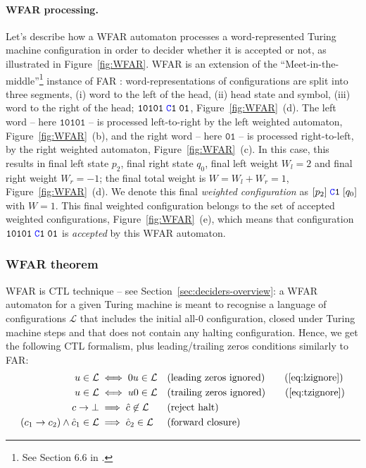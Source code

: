 \paragraph{WFAR processing.} Let's describe how a WFAR automaton processes a word-represented Turing machine configuration in order to decider whether it is accepted or not, as illustrated in Figure~\ref{fig:WFAR}. WFAR is an extension of the ``Meet-in-the-middle''\footnote{See Section 6.6 in \cite{bbchallengePart1}.} instance of FAR \cite{bbchallengePart1}: word-representations of configurations are split into three segments, (i) word to the left of the head, (ii) head state and symbol, (iii) word to the right of the head; \eg $\texttt{10101}\; \texttt{\stateC}\sone\; \texttt{01}$, Figure~\ref{fig:WFAR}~(d). The left word -- here $\texttt{10101}$ -- is processed left-to-right by the left weighted automaton, Figure~\ref{fig:WFAR}~(b), and the right word -- here $\texttt{01}$ -- is processed right-to-left, by the right weighted automaton, Figure~\ref{fig:WFAR}~(c). In this case, this results in final left state $p_2$, final right state $q_0$, final left weight $W_l = 2$ and final right weight $W_r = -1$; the final total weight is $W = W_l + W_r = 1$, Figure~\ref{fig:WFAR}~(d). We denote this final \textit{weighted configuration} as $[p_2]\; \texttt{\stateC}\sone\; [q_0]$ with $W=1$. This final weighted configuration belongs to the set of accepted weighted configurations, Figure~\ref{fig:WFAR}~(e), which means that configuration $\texttt{10101}\; \texttt{\stateC}\sone\; \texttt{01}$ is \textit{accepted} by this WFAR automaton.


\subsubsection{WFAR theorem}

WFAR is CTL technique -- see Section~\ref{sec:deciders-overview}: a WFAR automaton for a given Turing machine is meant to recognise a language of configurations $\mathcal{L}$ that includes the initial all-0 configuration, closed under Turing machine steps and that does not contain any halting configuration. Hence, we get the following CTL formalism, plus leading/trailing zeros conditions similarly to FAR:
\begin{align}
    u \in \mathcal{L}                               & \iff 0u \in \mathcal{L}               &  & \text{(leading zeros ignored)}
    \tag{\ref{eq:lzignore}}
    \\
    u \in \mathcal{L}                               & \iff u0 \in \mathcal{L}               &  & \text{(trailing zeros ignored)}
    \tag{\ref{eq:tzignore}}
    \\
    c\TMstep\bot                                    & \implies \hat{c} \not \in \mathcal{L} &  & \text{(reject halt)} \label{eq:rejecthalt}     \\
    (c_1\TMstep c_2)\land \hat{c}_1 \in \mathcal{L} & \implies\hat{c}_2 \in \mathcal{L}     &  & \text{(forward closure)} \label{eq:rejecthalt}
\end{align}

